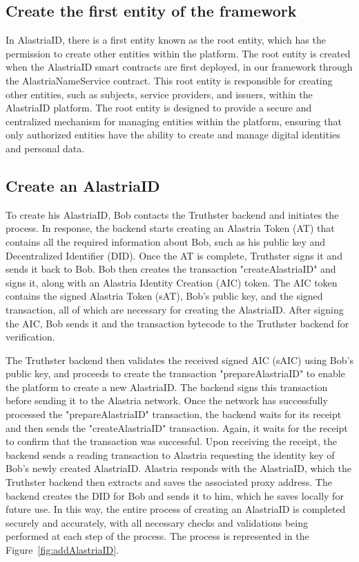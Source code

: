 \documentclass[target=mst,aauheader=]{thud}
\begin{document}
\subsection{Create the first entity of the framework}

In AlastriaID, there is a first entity known as the root entity, which has the permission to create other entities within the platform. The root entity is created when the AlastriaID smart contracts are first deployed, in our framework through the AlastriaNameService contract. This root entity is responsible for creating other entities, such as subjects, service providers, and issuers, within the AlastriaID platform. The root entity is designed to provide a secure and centralized mechanism for managing entities within the platform, ensuring that only authorized entities have the ability to create and manage digital identities and personal data.

\subsection{Create an AlastriaID}

To create his AlastriaID, Bob contacts the Truthster backend and initiates the process. In response, the backend starts creating an Alastria Token (AT) that contains all the required information about Bob, such as his public key and Decentralized Identifier (DID). Once the AT is complete, Truthster signs it and sends it back to Bob. Bob then creates the transaction "createAlastriaID" and signs it, along with an Alastria Identity Creation (AIC) token. The AIC token contains the signed Alastria Token (sAT), Bob's public key, and the signed transaction, all of which are necessary for creating the AlastriaID. After signing the AIC, Bob sends it and the transaction bytecode to the Truthster backend for verification.\par
The Truthster backend then validates the received signed AIC (sAIC) using Bob's public key, and proceeds to create the transaction "prepareAlastriaID" to enable the platform to create a new AlastriaID. The backend signs this transaction before sending it to the Alastria network. Once the network has successfully processed the "prepareAlastriaID" transaction, the backend waits for its receipt and then sends the "createAlastriaID" transaction. Again, it waits for the receipt to confirm that the transaction was successful. Upon receiving the receipt, the backend sends a reading transaction to Alastria requesting the identity key of Bob's newly created AlastriaID. Alastria responds with the AlastriaID, which the Truthster backend then extracts and saves the associated proxy address. The backend creates the DID for Bob and sends it to him, which he saves locally for future use. In this way, the entire process of creating an AlastriaID is completed securely and accurately, with all necessary checks and validations being performed at each step of the process.
The process is represented in the Figure~\ref{fig:addAlastriaID}.
\end{document}
